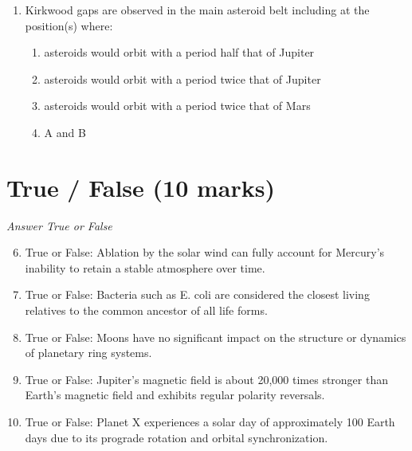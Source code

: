 \documentclass[12pt]{article}
\begin{document}
\begin{enumerate}[label=\arabic*.]
\begin{enumerate}[label=(\alph*)]
    \item in the center of the asteroid belt
    \item on orbits that cross Earth's orbit
    \item surrounding Jupiter
    \item along Jupiter's orbit 60^\ensuremath{\circ} ahead of and behind Jupiter
\end{enumerate}
\item Kirkwood gaps are observed in the main asteroid belt including at the position(s) where:
\begin{enumerate}[label=(\alph*)]
    \item asteroids would orbit with a period half that of Jupiter
    \item asteroids would orbit with a period twice that of Jupiter
    \item asteroids would orbit with a period twice that of Mars
    \item A and B
\end{enumerate}
\end{enumerate}

\section*{True / False (10 marks)}
\textit{Answer True or False}
\begin{enumerate}[label=\arabic*.]
\setcounter{enumi}{5}
\item True or False: Ablation by the solar wind can fully account for Mercury's inability to retain a stable atmosphere over time.
\item True or False: Bacteria such as E. coli are considered the closest living relatives to the common ancestor of all life forms.
\item True or False: Moons have no significant impact on the structure or dynamics of planetary ring systems.
\item True or False: Jupiter's magnetic field is about 20,000 times stronger than Earth's magnetic field and exhibits regular polarity reversals.
\item True or False: Planet X experiences a solar day of approximately 100 Earth days due to its prograde rotation and orbital synchronization.
\end{enumerate}
\end{document}
